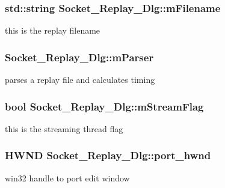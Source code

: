 \subsubsection[{m\+Filename}]{\setlength{\rightskip}{0pt plus 5cm}std\+::string Socket\+\_\+\+Replay\+\_\+\+Dlg\+::m\+Filename\hspace{0.3cm}{\ttfamily [protected]}}\label{class_socket___replay___dlg_ab9d98b70c4ae758d9c9e22c707873188}
this is the replay filename \hypertarget{class_socket___replay___dlg_a6d2cb27043d1247d1368b594c43759ea}{}
\subsubsection[{m\+Parser}]{ Socket\+\_\+\+Replay\+\_\+\+Dlg\+::m\+Parser}\label{class_socket___replay___dlg_a6d2cb27043d1247d1368b594c43759ea}
parses a replay file and calculates timing \hypertarget{class_socket___replay___dlg_a8cd78cb4dff6ecf4e8dd28f594a576d5}{}
\subsubsection[{m\+Stream\+Flag}]{\setlength{\rightskip}{0pt plus 5cm}bool Socket\+\_\+\+Replay\+\_\+\+Dlg\+::m\+Stream\+Flag\hspace{0.3cm}{\ttfamily [protected]}}\label{class_socket___replay___dlg_a8cd78cb4dff6ecf4e8dd28f594a576d5}
this is the streaming thread flag \hypertarget{class_socket___replay___dlg_ad75481e9b07fe142613fa5a03939498e}{}
\subsubsection[{port\+\_\+hwnd}]{\setlength{\rightskip}{0pt plus 5cm}H\+W\+N\+D Socket\+\_\+\+Replay\+\_\+\+Dlg\+::port\+\_\+hwnd\hspace{0.3cm}{\ttfamily [protected]}}\label{class_socket___replay___dlg_ad75481e9b07fe142613fa5a03939498e}
win32 handle to port edit window \hypertarget{class_socket___replay___dlg_abe629565b9f82aff477a8e1b9c605073}{}

